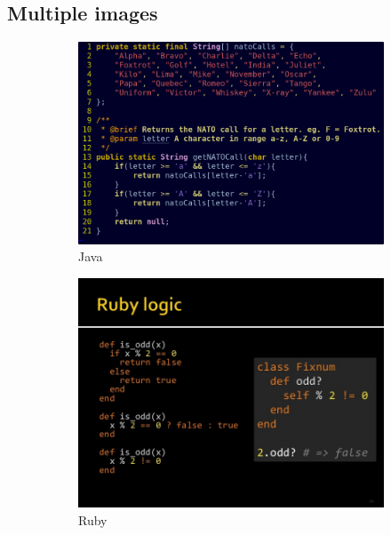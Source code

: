 \subsection{Multiple images}
\begin{figure}[H]
	\centering
	\begin{subfigure}[b]{0.3\textwidth}
		\centering
		\includegraphics[width=\textwidth]{images/programmingLanguages/java.jpg}
		\caption{Java}
		\label{Java}
	\end{subfigure}
	\hfill
	\begin{subfigure}[b]{0.3\textwidth}
		\centering
		\includegraphics[width=\textwidth]{images/programmingLanguages/ruby.jpg}
		\caption{Ruby}
		\label{fig:ruby}
	\end{subfigure}
	\hfill
	\begin{subfigure}[b]{0.3\textwidth}

\end{subfigure}
\end{figure}
